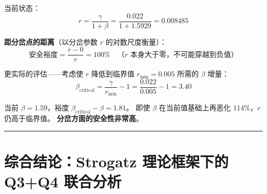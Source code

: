 \documentclass[12pt,a4paper]{article}
\begin{document}
当前状态：
\begin{equation}
r = \frac{\gamma}{1+\beta} = \frac{0.022}{1+1.5929} = 0.008485
\end{equation}

\textbf{距分岔点的距离}（以分岔参数 $r$ 的对数尺度衡量）：
\begin{equation}
\text{安全裕度} = \frac{r - 0}{r} = 100\% \quad \text{（$r$ 本身大于零，不可能穿越到负值）}
\end{equation}

更实际的评估——考虑使 $r$ 降低到临界值 $r_{\min} = 0.005$ 所需的 $\beta$ 增量：
\begin{equation}
\beta_{\text{critical}} = \frac{\gamma}{r_{\min}} - 1 = \frac{0.022}{0.005} - 1 = 3.40
\end{equation}

当前 $\beta = 1.59$，裕度 $\beta_{\text{critical}} - \beta = 1.81$。
即使 $\beta$ 在当前值基础上再恶化 $114\%$，$r$ 仍高于临界值。
\textbf{分岔方面的安全性非常高}。

\vspace{12pt}
\hrule
\vspace{12pt}

\section{综合结论：Strogatz 理论框架下的 Q3+Q4 联合分析}
\end{document}
